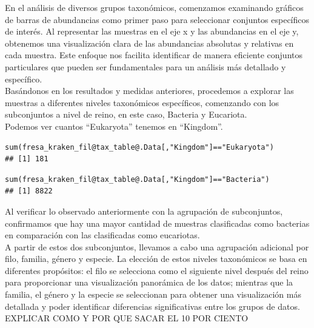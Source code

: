 En el análisis de diversos grupos taxonómicos, comenzamos examinando gráficos de barras de abundancias como primer paso para seleccionar conjuntos específicos de interés. Al representar las muestras en el eje x y las abundancias en el eje y, obtenemos una visualización clara de las abundancias absolutas y relativas en cada muestra. Este enfoque nos facilita identificar de manera eficiente conjuntos particulares que pueden ser fundamentales para un análisis más detallado y específico.\\

Basándonos en los resultados y medidas anteriores, procedemos a explorar las muestras a diferentes niveles taxonómicos específicos, comenzando con los subconjuntos a nivel de reino, en este caso, Bacteria y Eucariota.\\

Podemos ver cuantos “Eukaryota” tenemos en “Kingdom”.
\begin{lstlisting}[basicstyle=\small] 
sum(fresa_kraken_fil@tax_table@.Data[,"Kingdom"]=="Eukaryota")
## [1] 181
\end{lstlisting}
\begin{lstlisting}[basicstyle=\small] 
sum(fresa_kraken_fil@tax_table@.Data[,"Kingdom"]=="Bacteria")
## [1] 8822
\end{lstlisting}

Al verificar lo observado anteriormente con la agrupación de subconjuntos, confirmamos que hay una mayor cantidad de muestras clasificadas como bacterias en comparación con las clasificadas como eucariotas.\\

A partir de estos dos subconjuntos, llevamos a cabo una agrupación adicional por filo, familia, género y especie. La elección de estos niveles taxonómicos se basa en diferentes propósitos: el filo se selecciona como el siguiente nivel después del reino para proporcionar una visualización panorámica de los datos; mientras que la familia, el género y la especie se seleccionan para obtener una visualización más detallada y poder identificar diferencias significativas entre los grupos de datos.\\

EXPLICAR COMO Y  POR QUE SACAR EL 10 POR CIENTO\\

